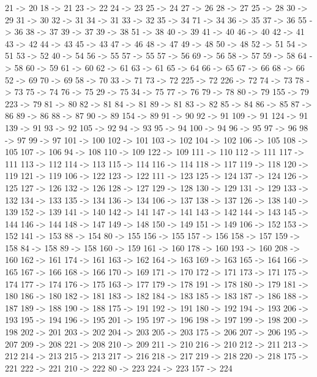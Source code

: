 {	21 -> 20
	18 -> 21
	23 -> 22
	24 -> 23
	25 -> 24
	27 -> 26
	28 -> 27
	25 -> 28
	30 -> 29
	31 -> 30
	32 -> 31
	34 -> 31
	33 -> 32
	35 -> 34
	71 -> 34
	36 -> 35
	37 -> 36
	55 -> 36
	38 -> 37
	39 -> 37
	39 -> 38
	51 -> 38
	40 -> 39
	41 -> 40
	46 -> 40
	42 -> 41
	43 -> 42
	44 -> 43
	45 -> 43
	47 -> 46
	48 -> 47
	49 -> 48
	50 -> 48
	52 -> 51
	54 -> 51
	53 -> 52
	40 -> 54
	56 -> 55
	57 -> 55
	57 -> 56
	69 -> 56
	58 -> 57
	59 -> 58
	64 -> 58
	60 -> 59
	61 -> 60
	62 -> 61
	63 -> 61
	65 -> 64
	66 -> 65
	67 -> 66
	68 -> 66
	52 -> 69
	70 -> 69
	58 -> 70
	33 -> 71
	73 -> 72
	225 -> 72
	226 -> 72
	74 -> 73
	78 -> 73
	75 -> 74
	76 -> 75
	29 -> 75
	34 -> 75
	77 -> 76
	79 -> 78
	80 -> 79
	155 -> 79
	223 -> 79
	81 -> 80
	82 -> 81
	84 -> 81
	89 -> 81
	83 -> 82
	85 -> 84
	86 -> 85
	87 -> 86
	89 -> 86
	88 -> 87
	90 -> 89
	154 -> 89
	91 -> 90
	92 -> 91
	109 -> 91
	124 -> 91
	139 -> 91
	93 -> 92
	105 -> 92
	94 -> 93
	95 -> 94
	100 -> 94
	96 -> 95
	97 -> 96
	98 -> 97
	99 -> 97
	101 -> 100
	102 -> 101
	103 -> 102
	104 -> 102
	106 -> 105
	108 -> 105
	107 -> 106
	94 -> 108
	110 -> 109
	122 -> 109
	111 -> 110
	112 -> 111
	117 -> 111
	113 -> 112
	114 -> 113
	115 -> 114
	116 -> 114
	118 -> 117
	119 -> 118
	120 -> 119
	121 -> 119
	106 -> 122
	123 -> 122
	111 -> 123
	125 -> 124
	137 -> 124
	126 -> 125
	127 -> 126
	132 -> 126
	128 -> 127
	129 -> 128
	130 -> 129
	131 -> 129
	133 -> 132
	134 -> 133
	135 -> 134
	136 -> 134
	106 -> 137
	138 -> 137
	126 -> 138
	140 -> 139
	152 -> 139
	141 -> 140
	142 -> 141
	147 -> 141
	143 -> 142
	144 -> 143
	145 -> 144
	146 -> 144
	148 -> 147
	149 -> 148
	150 -> 149
	151 -> 149
	106 -> 152
	153 -> 152
	141 -> 153
	88 -> 154
	80 -> 155
	156 -> 155
	157 -> 156
	158 -> 157
	159 -> 158
	84 -> 158
	89 -> 158
	160 -> 159
	161 -> 160
	178 -> 160
	193 -> 160
	208 -> 160
	162 -> 161
	174 -> 161
	163 -> 162
	164 -> 163
	169 -> 163
	165 -> 164
	166 -> 165
	167 -> 166
	168 -> 166
	170 -> 169
	171 -> 170
	172 -> 171
	173 -> 171
	175 -> 174
	177 -> 174
	176 -> 175
	163 -> 177
	179 -> 178
	191 -> 178
	180 -> 179
	181 -> 180
	186 -> 180
	182 -> 181
	183 -> 182
	184 -> 183
	185 -> 183
	187 -> 186
	188 -> 187
	189 -> 188
	190 -> 188
	175 -> 191
	192 -> 191
	180 -> 192
	194 -> 193
	206 -> 193
	195 -> 194
	196 -> 195
	201 -> 195
	197 -> 196
	198 -> 197
	199 -> 198
	200 -> 198
	202 -> 201
	203 -> 202
	204 -> 203
	205 -> 203
	175 -> 206
	207 -> 206
	195 -> 207
	209 -> 208
	221 -> 208
	210 -> 209
	211 -> 210
	216 -> 210
	212 -> 211
	213 -> 212
	214 -> 213
	215 -> 213
	217 -> 216
	218 -> 217
	219 -> 218
	220 -> 218
	175 -> 221
	222 -> 221
	210 -> 222
	80 -> 223
	224 -> 223
	157 -> 224
}
